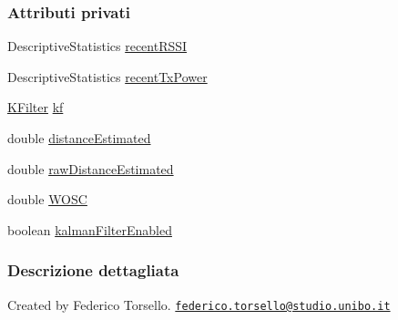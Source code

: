 \subsubsection*{Attributi privati}
\begin{DoxyCompactItemize}
\item 
Descriptive\+Statistics \hyperlink{classit_1_1unibo_1_1torsello_1_1bluetoothpositioning_1_1distanceEstimation_1_1Estimation_a4edd1c580372b087a9d8fc167715088a_a4edd1c580372b087a9d8fc167715088a}{recent\+R\+S\+SI}
\item 
Descriptive\+Statistics \hyperlink{classit_1_1unibo_1_1torsello_1_1bluetoothpositioning_1_1distanceEstimation_1_1Estimation_a4258d96e807fa104223635ecb7ddc940_a4258d96e807fa104223635ecb7ddc940}{recent\+Tx\+Power}
\item 
\hyperlink{classit_1_1unibo_1_1torsello_1_1bluetoothpositioning_1_1filters_1_1kalmanFilter_1_1KFilter}{K\+Filter} \hyperlink{classit_1_1unibo_1_1torsello_1_1bluetoothpositioning_1_1distanceEstimation_1_1Estimation_a93af801219b710f3a048e7db1c7a8982_a93af801219b710f3a048e7db1c7a8982}{kf}
\item 
double \hyperlink{classit_1_1unibo_1_1torsello_1_1bluetoothpositioning_1_1distanceEstimation_1_1Estimation_a7a5514b25ac6495842a53e54319be10d_a7a5514b25ac6495842a53e54319be10d}{distance\+Estimated}
\item 
double \hyperlink{classit_1_1unibo_1_1torsello_1_1bluetoothpositioning_1_1distanceEstimation_1_1Estimation_a5afcd0b9b73a92b64669f060206f35db_a5afcd0b9b73a92b64669f060206f35db}{raw\+Distance\+Estimated}
\item 
double \hyperlink{classit_1_1unibo_1_1torsello_1_1bluetoothpositioning_1_1distanceEstimation_1_1Estimation_a53237b14bc1d27ae4f751b02d798b595_a53237b14bc1d27ae4f751b02d798b595}{W\+O\+SC}
\item 
boolean \hyperlink{classit_1_1unibo_1_1torsello_1_1bluetoothpositioning_1_1distanceEstimation_1_1Estimation_abfb2f400444016cb1323e100d2d8c5b8_abfb2f400444016cb1323e100d2d8c5b8}{kalman\+Filter\+Enabled}
\end{DoxyCompactItemize}


\subsubsection{Descrizione dettagliata}
Created by Federico Torsello. \href{mailto:federico.torsello@studio.unibo.it}{\tt federico.\+torsello@studio.\+unibo.\+it} 

